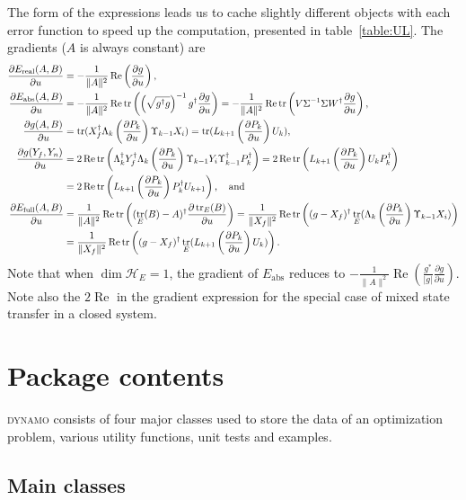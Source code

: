 \documentclass[aps, pra, a4paper, longbibliography, superscriptaddress]{revtex4-1}
\newcommand{\hilb}[1]{\mathcal{#1}}
\DeclareMathOperator{\tr}{tr}
\DeclareMathOperator{\re}{Re}
\newcommand{\spr}{\Upsilon}
\newcommand{\dd}[2]{\frac{\partial #1}{\partial #2}}
\newcommand{\DYNAMO}{\textsc{dynamo}}
\begin{document}
The form of the expressions leads us to cache slightly different objects with
each error function to speed up the computation, presented in table~\ref{table:UL}.
The gradients ($A$ is always constant) are
\begin{align}
\dd{E_\text{real}(A,B)}{u}
&= -\frac{1}{\|A\|^2} \re \left( \dd{g}{u} \right),\\
\dd{E_\text{abs}(A,B)}{u}
&= -\frac{1}{\|A\|^2} \re \tr \left(\left(\sqrt{g^\dagger g}\right)^{-1} g^\dagger \dd{g}{u}\right)
= -\frac{1}{\|A\|^2} \re \tr \left(V \Sigma^{-1} \Sigma W^\dagger \dd{g}{u}\right),\\
\dd{g(A, B)}{u} &= \tr(X_f^\dagger \Lambda_{k} \left(\dd{P_k}{u}\right) \spr_{k-1} X_i)
= \tr(L_{k+1} \left(\dd{P_k}{u}\right) U_{k}),\\
\notag
\dd{g(Y_f, Y_n)}{u} &= 2 \re \tr\left(\Lambda_k^\dagger Y_f^\dagger \Lambda_k \left(\dd{P_k}{u}\right) \spr_{k-1} Y_i \spr_{k-1}^\dagger P_k^\dagger \right)
= 2 \re \tr\left(L_{k+1} \left(\dd{P_k}{u}\right) U_{k} P_k^\dagger \right)\\
&= 2 \re \tr\left(L_{k+1} \left(\dd{P_k}{u}\right) P_k^\dagger U_{k+1} \right), \quad \text{and}\\
\notag
\dd{E_\text{full}(A, B)}{u}
&= \frac{1}{\|A\|^2} \re \tr\left((\tr_E(B)-A)^\dagger \dd{\tr_E(B)}{u}\right)
= \frac{1}{\|X_f\|^2} \re \tr\left((g -X_f)^\dagger  \tr_E(\Lambda_{k} \left(\dd{P_k}{u}\right) \spr_{k-1} X_i) \right)\\
&= \frac{1}{\|X_f\|^2} \re \tr\left((g -X_f)^\dagger  \tr_E(L_{k+1} \left(\dd{P_k}{u}\right) U_{k}) \right).
\end{align}
Note that when $\dim \hilb{H}_E = 1$, the gradient of $E_\text{abs}$
reduces to
$-\frac{1}{\|A\|^2} \re \left(\frac{g^*}{|g|} \dd{g}{u} \right)$.\\
Note also the $2 \re$ in the gradient expression  
for the special case of mixed state transfer in a closed system.








\section{Package contents}

\DYNAMO{} consists of four major classes used to store the data of an
optimization problem, various utility functions, unit tests and examples.

\subsection{Main classes}
\end{document}
